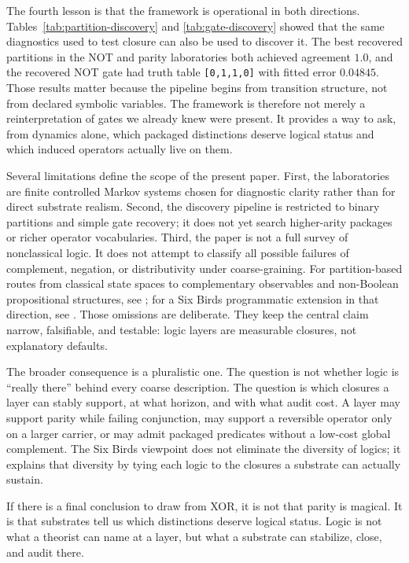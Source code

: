 \documentclass[11pt]{article}
\theoremstyle{definition}
\begin{document}
The fourth lesson is that the framework is operational in both directions. Tables~\ref{tab:partition-discovery} and \ref{tab:gate-discovery} showed that the same diagnostics used to test closure can also be used to discover it. The best recovered partitions in the NOT and parity laboratories both achieved agreement \(1.0\), and the recovered NOT gate had truth table \texttt{[0,1,1,0]} with fitted error \(0.04845\). Those results matter because the pipeline begins from transition structure, not from declared symbolic variables. The framework is therefore not merely a reinterpretation of gates we already knew were present. It provides a way to ask, from dynamics alone, which packaged distinctions deserve logical status and which induced operators actually live on them.

Several limitations define the scope of the present paper. First, the laboratories are finite controlled Markov systems chosen for diagnostic clarity rather than for direct substrate realism. Second, the discovery pipeline is restricted to binary partitions and simple gate recovery; it does not yet search higher-arity packages or richer operator vocabularies. Third, the paper is not a full survey of nonclassical logic. It does not attempt to classify all possible failures of complement, negation, or distributivity under coarse-graining.
For partition-based routes from classical state spaces to complementary observables and non-Boolean propositional structures, see \cite{atmanspacher2015nonboolean}; for a Six Birds programmatic extension in that direction, see \cite{tsiokos2026quantum}.
Those omissions are deliberate. They keep the central claim narrow, falsifiable, and testable: logic layers are measurable closures, not explanatory defaults.

The broader consequence is a pluralistic one. The question is not whether logic is ``really there'' behind every coarse description. The question is which closures a layer can stably support, at what horizon, and with what audit cost. A layer may support parity while failing conjunction, may support a reversible operator only on a larger carrier, or may admit packaged predicates without a low-cost global complement. The Six Birds viewpoint does not eliminate the diversity of logics; it explains that diversity by tying each logic to the closures a substrate can actually sustain.

If there is a final conclusion to draw from XOR, it is not that parity is magical. It is that substrates tell us which distinctions deserve logical status. Logic is not what a theorist can name at a layer, but what a substrate can stabilize, close, and audit there.
 \appendix
\end{document}
